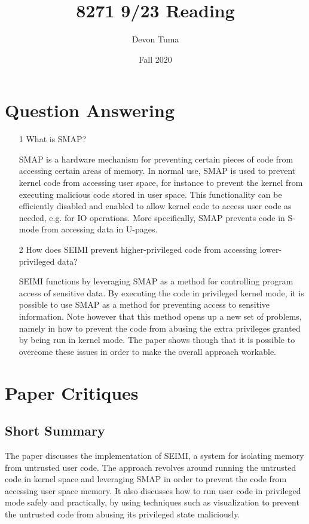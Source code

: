 \documentclass[11pt]{article}
\title{8271 9/23 Reading}
\author{Devon Tuma}
\date{Fall 2020}
\begin{document}
\maketitle

\section*{Question Answering}

\begin{itemize}
\item [1] What is SMAP?

  SMAP is a hardware mechanism for preventing certain pieces of code from accessing certain areas of memory. In normal use, SMAP is used to prevent kernel code from accessing user space, for instance to prevent the kernel from executing malicious code stored in user space. This functionality can be efficiently disabled and enabled to allow kernel code to access user code as needed, e.g. for IO operations. More specifically, SMAP prevents code in S-mode from accessing data in U-pages.
  
\item [2] How does SEIMI prevent higher-privileged code from accessing lower-privileged data?

  SEIMI functions by leveraging SMAP as a method for controlling program access of sensitive data. By executing the code in privileged kernel mode, it is possible to use SMAP as a method for preventing access to sensitive information. Note however that this method opens up a new set of problems, namely in how to prevent the code from abusing the extra privileges granted by being run in kernel mode. The paper shows though that it is possible to overcome these issues in order to make the overall approach workable.
  
\end{itemize}

\section*{Paper Critiques}

\subsection*{Short Summary}

The paper discusses the implementation of SEIMI, a system for isolating memory from untrusted user code. The approach revolves around running the untrusted code in kernel space and leveraging SMAP in order to prevent the code from accessing user space memory. It also discusses how to run user code in privileged mode safely and practically, by using techniques such as visualization to prevent the untrusted code from abusing its privileged state maliciously.  
\end{document}
